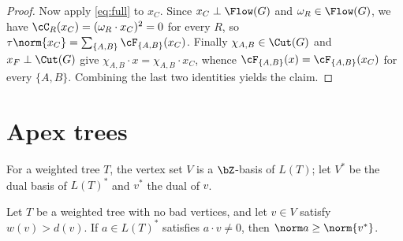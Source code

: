 \begin{proof}
Now apply \eqref{eq:full} to $x_C$.  Since $x_C\perp\Flow(G)$ and $\omega_R\in\Flow(G)$, we
have $\cC_R(x_C)=(\omega_R\cdot x_C)^2=0$ for every $R$, so
$\tau\norm{x_C}=\sum_{\{A,B\}}\cF_{\{A,B\}}(x_C)$.  Finally $\chi_{A,B}\in\Cut(G)$ and
$x_F\perp\Cut(G)$ give $\chi_{A,B}\cdot x=\chi_{A,B}\cdot x_C$, whence
$\cF_{\{A,B\}}(x)=\cF_{\{A,B\}}(x_C)$ for every $\{A,B\}$.  Combining the last two
identities yields the claim.
\end{proof}

\section{Apex trees}
\label{sec:apex}

For a weighted tree $T$, the vertex set $V$ is a $\bZ$-basis of $L(T)$; let $V^\ast$ be the
dual basis of $L(T)^\ast$ and $v^\ast$ the dual of $v$.

\begin{lem}
\label{lem:apex}
Let $T$ be a weighted tree with no bad vertices, and let $v\in V$ satisfy $w(v)>d(v)$.  If
$a\in L(T)^\ast$ satisfies $a\cdot v\ne 0$, then $\norm a\ge\norm{v^\ast}$.
\end{lem}

